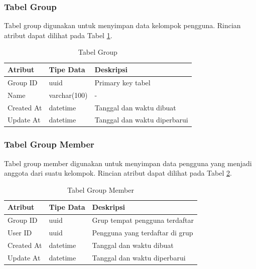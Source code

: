 \subsubsection{Tabel Group}
\par Tabel group digunakan untuk menyimpan data kelompok pengguna. Rincian atribut dapat dilihat pada Tabel \ref{tabel_group}.
\begin{longtable}{|p{2cm}|p{2.5cm}|p{4.5cm}|}
	\caption{Tabel Group} \label{tabel_group} \\ \hline
    {Atribut} & {Tipe Data} & {Deskripsi} \\ \hline
    Group ID & uuid & Primary key tabel \\ \hline
    Name & varchar(100) & - \\ \hline
    Created At & datetime & Tanggal dan waktu dibuat \\ \hline
    Update At & datetime & Tanggal dan waktu diperbarui \\ \hline
\end{longtable}

\subsubsection{Tabel Group Member}
\par Tabel group member digunakan untuk menyimpan data pengguna yang menjadi anggota dari suatu kelompok. Rincian atribut dapat dilihat pada Tabel \ref{tabel_group_member}.
\begin{longtable}{|p{2cm}|p{2.5cm}|p{4.5cm}|}
	\caption{Tabel Group Member} \label{tabel_group_member} \\ \hline
    {Atribut} & {Tipe Data} & {Deskripsi} \\ \hline
    Group ID & uuid & Grup tempat pengguna terdaftar \\ \hline
    User ID & uuid & Pengguna yang terdaftar di grup \\ \hline
    Created At & datetime & Tanggal dan waktu dibuat \\ \hline
    Update At & datetime & Tanggal dan waktu diperbarui \\ \hline
\end{longtable}

